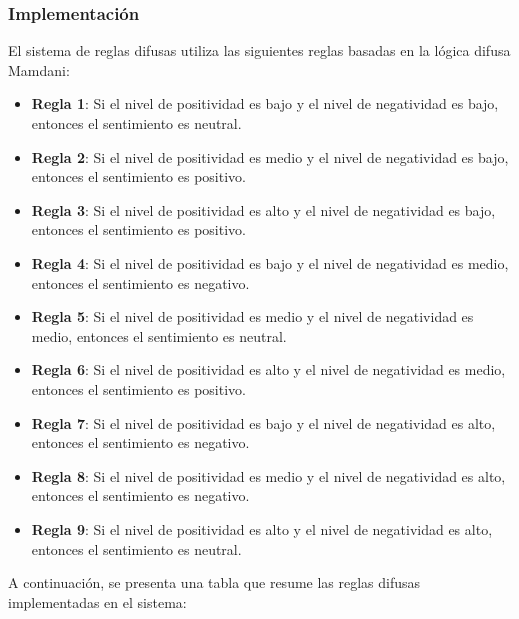 \documentclass[sigconf, review=false, nonacm]{acmart}
\begin{document}
\subsubsection{Implementación}
El sistema de reglas difusas utiliza las siguientes reglas basadas en la lógica difusa Mamdani:
\begin{itemize}
	\item \textbf{Regla 1}: Si el nivel de positividad es bajo y el nivel de negatividad es bajo, entonces el
	      sentimiento es neutral.
	\item \textbf{Regla 2}: Si el nivel de positividad es medio y el nivel de negatividad es bajo, entonces el
	      sentimiento es positivo.
	\item \textbf{Regla 3}: Si el nivel de positividad es alto y el nivel de negatividad es bajo, entonces el
	      sentimiento es positivo.
	\item \textbf{Regla 4}: Si el nivel de positividad es bajo y el nivel de negatividad es medio, entonces el
	      sentimiento es negativo.
	\item \textbf{Regla 5}: Si el nivel de positividad es medio y el nivel de negatividad es medio, entonces
	      el sentimiento es neutral.
	\item \textbf{Regla 6}: Si el nivel de positividad es alto y el nivel de negatividad es medio, entonces el
	      sentimiento es positivo.
	\item \textbf{Regla 7}: Si el nivel de positividad es bajo y el nivel de negatividad es alto, entonces el
	      sentimiento es negativo.
	\item \textbf{Regla 8}: Si el nivel de positividad es medio y el nivel de negatividad es alto, entonces el
	      sentimiento es negativo.
	\item \textbf{Regla 9}: Si el nivel de positividad es alto y el nivel de negatividad es alto, entonces el
	      sentimiento es neutral.
\end{itemize}

A continuación, se presenta una tabla que resume las reglas difusas implementadas en el sistema:
\end{document}

